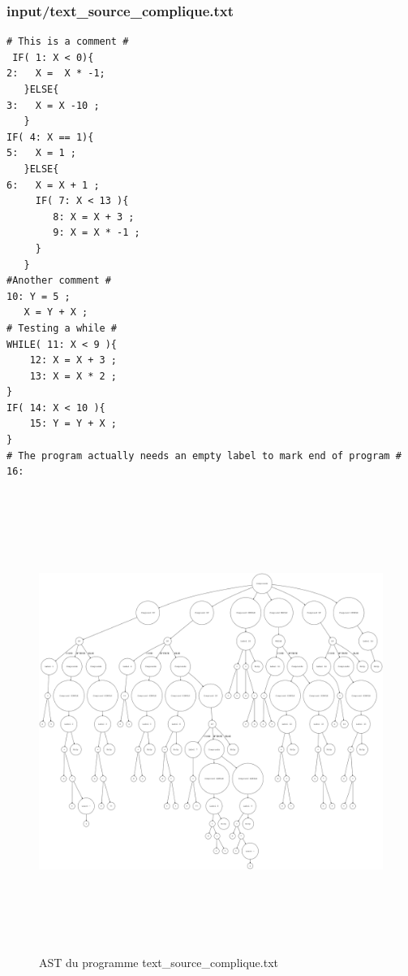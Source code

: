\documentclass[a4paper]{article}
\begin{document}
\subsubsection{input/text\_source\_complique.txt}

\begin{verbatim}
# This is a comment #
 IF( 1: X < 0){
2:   X =  X * -1;
   }ELSE{
3:   X = X -10 ;
   }
IF( 4: X == 1){
5:   X = 1 ;
   }ELSE{
6:   X = X + 1 ;
     IF( 7: X < 13 ){
        8: X = X + 3 ;
        9: X = X * -1 ;
     }
   }
#Another comment #
10: Y = 5 ;
   X = Y + X ;
# Testing a while #
WHILE( 11: X < 9 ){
    12: X = X + 3 ;
    13: X = X * 2 ;
}
IF( 14: X < 10 ){
    15: Y = Y + X ;
}
# The program actually needs an empty label to mark end of program #
16:
\end{verbatim}

\begin{figure}[h!]
  \centering
  \includegraphics[width=15cm,height=15cm,keepaspectratio]{input/text_source_complique_ast.png}
  \caption{AST du programme text\_source\_complique.txt}
  \label{fig:ast3}
\end{figure}
\end{document}
